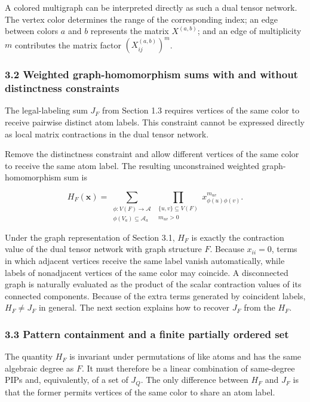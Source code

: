 A colored multigraph can be interpreted directly as such a dual tensor network. The vertex color determines the range of the corresponding index; an edge between colors \(a\) and \(b\) represents the matrix \(X^{(a,b)}\); and an edge of multiplicity \(m\) contributes the matrix factor \((X^{(a,b)}_{ij})^m\).

\subsubsection{3.2 Weighted graph-homomorphism sums with and without distinctness constraints}\label{sec:homomorphism-sums}

The legal-labeling sum \(J_F\) from Section 1.3 requires vertices of the same color to receive pairwise distinct atom labels. This constraint cannot be expressed directly as local matrix contractions in the dual tensor network.

Remove the distinctness constraint and allow different vertices of the same color to receive the same atom label. The resulting unconstrained weighted graph-homomorphism sum is

\[
H_F(\mathbf x)
=
\sum_{\substack{\phi:V(F)\rightarrow\mathcal A\\
\phi(V_a)\subseteq\mathcal A_a}}
\prod_{\substack{\{u,v\}\subseteq V(F)\\m_{uv}>0}}
x_{\phi(u)\phi(v)}^{m_{uv}} .
\]

Under the graph representation of Section 3.1, \(H_F\) is exactly the contraction value of the dual tensor network with graph structure \(F\). Because \(x_{ii}=0\), terms in which adjacent vertices receive the same label vanish automatically, while labels of nonadjacent vertices of the same color may coincide. A disconnected graph is naturally evaluated as the product of the scalar contraction values of its connected components. Because of the extra terms generated by coincident labels, \(H_F\ne J_F\) in general. The next section explains how to recover \(J_F\) from the \(H_F\).

\subsubsection{3.3 Pattern containment and a finite partially ordered set}\label{sec:quotient-poset}

The quantity \(H_F\) is invariant under permutations of like atoms and has the same algebraic degree as \(F\). It must therefore be a linear combination of same-degree PIPs and, equivalently, of a set of \(J_Q\). The only difference between \(H_F\) and \(J_F\) is that the former permits vertices of the same color to share an atom label.

